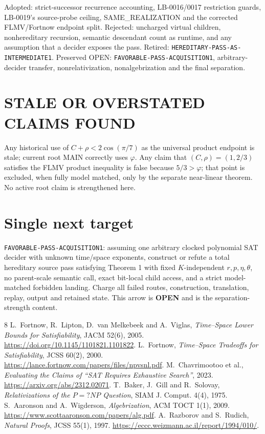 \documentclass[11pt]{article}
\newcommand{\OPEN}{\textbf{OPEN}}
\begin{document}
Adopted: strict-successor recurrence accounting, LB-0016/0017 restriction
guards, LB-0019's source-probe ceiling, SAME\_REALIZATION and the corrected
FLMV/Fortnow endpoint split.  Rejected: uncharged virtual children,
nonhereditary recursion, semantic descendant count as runtime, and any
assumption that a decider exposes the pass.  Retired:
\texttt{HEREDITARY-PASS-AS-INTERMEDIATE1}.  Preserved OPEN:
\texttt{FAVORABLE-PASS-ACQUISITION1}, arbitrary-decider transfer,
nonrelativization, nonalgebrization and the final separation.

\section{STALE OR OVERSTATED CLAIMS FOUND}

Any historical use of $C+\rho<2\cos(\pi/7)$ as the universal product endpoint
is stale; current root MAIN correctly uses $\varphi$.  Any claim that
$(C,\rho)=(1,2/3)$ satisfies the FLMV product inequality is false because
$5/3>\varphi$; that point is excluded, when fully model matched, only by the
separate near-linear theorem.  No active root claim is strengthened here.

\section{Single next target}

\texttt{FAVORABLE-PASS-ACQUISITION1}: assuming one arbitrary clocked
polynomial SAT decider with unknown time/space exponents, construct or refute
a total hereditary source pass satisfying Theorem 1 with fixed
$K$-independent $r,p,\eta,\theta$, no parent-scale semantic call, exact
bit-local child access, and a strict model-matched forbidden landing.  Charge
all failed routes, construction, translation, replay, output and retained
state.  This arrow is \OPEN{} and is the separation-strength content.

\begin{thebibliography}{8}
 L.~Fortnow, R.~Lipton, D.~van Melkebeek and A.~Viglas,
\emph{Time--Space Lower Bounds for Satisfiability}, JACM 52(6), 2005.
\url{https://doi.org/10.1145/1101821.1101822}.
 L.~Fortnow, \emph{Time--Space Tradeoffs for
Satisfiability}, JCSS 60(2), 2000.
\url{https://lance.fortnow.com/papers/files/npvsnl.pdf}.
 M.~Chavrimootoo et al., \emph{Evaluating the Claims of
``SAT Requires Exhaustive Search''}, 2023.
\url{https://arxiv.org/abs/2312.02071}.
 T.~Baker, J.~Gill and R.~Solovay, \emph{Relativizations of the
$P=?NP$ Question}, SIAM J. Comput. 4(4), 1975.
 S.~Aaronson and A.~Wigderson, \emph{Algebrization}, ACM TOCT
1(1), 2009. \url{https://www.scottaaronson.com/papers/alg.pdf}.
 A.~Razborov and S.~Rudich, \emph{Natural Proofs}, JCSS 55(1),
1997. \url{https://eccc.weizmann.ac.il/report/1994/010/}.
\end{thebibliography}
\end{document}
